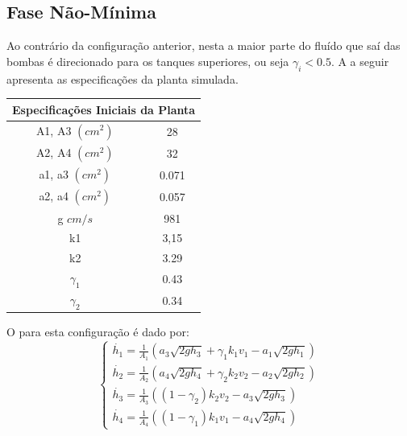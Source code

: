\subsection{Fase Não-Mínima}
Ao contrário da configuração anterior, nesta a maior parte do fluído que saí das bombas é direcionado  para os tanques superiores, ou seja $\gamma_i < 0.5$. A  a seguir apresenta as especificações da planta simulada.

\begin{center} \label{tabFaseNM}
	\begin{tabular}{|c|c|}
		\hline
		\multicolumn{2}{|c|}{Especificações Iniciais da Planta} \\
		\hline
		A1, A3 $(cm^2)$ & 28 \\ \hline
		A2, A4 $(cm^2)$ & 32 \\ \hline
		a1, a3 $(cm^2)$ & 0.071 \\ \hline
		a2, a4 $(cm^2)$ & 0.057 \\ \hline
		g $cm/s$ & 981 \\ \hline
		k1 & 3,15 \\ \hline
		k2 & 3.29 \\ \hline
		$\gamma_1$ & 0.43 \\ \hline
		$\gamma_2$ & 0.34 \\ \hline
		\hline
	\end{tabular}
\end{center}

O  para esta configuração é dado por:
\begin{equation}
\begin{cases}
\dot{h_{1}} = \frac{1}{A_{1}}(a_{3}\sqrt{2gh_{3}} + \gamma_{1}k_{1}v_{1} - a_{1}\sqrt{2gh_{1}})\\

\dot{h_{2}} = \frac{1}{A_{2}}(a_{4}\sqrt{2gh_{4}} + \gamma_{2}k_{2}v_{2} - a_{2}\sqrt{2gh_{2}})\\

\dot{h_{3}} = \frac{1}{A_{3}}((1 - \gamma_{2})k_{2}v_{2} - a_{3}\sqrt{2gh_{3}})\\

\dot{h_{4}} = \frac{1}{A_{4}}((1 - \gamma_{1})k_{1}v_{1} - a_{4}\sqrt{2gh_{4}})
\end{cases}
\label{eqFNMNL}
\end{equation}

